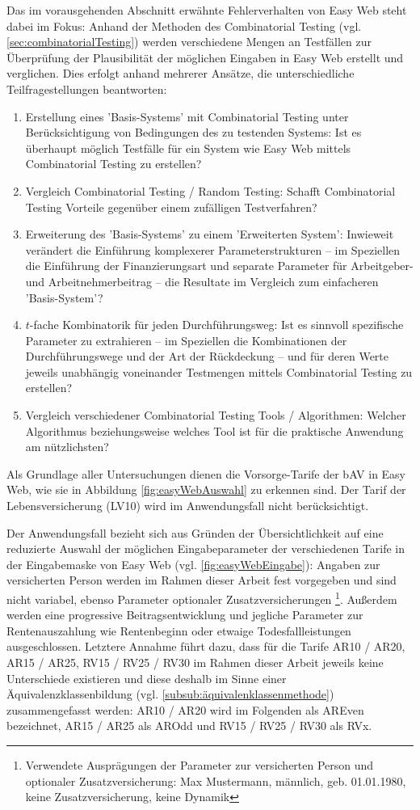 Das im vorausgehenden Abschnitt erwähnte Fehlerverhalten von Easy Web steht dabei im Fokus: Anhand der Methoden des Combinatorial Testing (vgl. \autoref{sec:combinatorialTesting}) werden verschiedene Mengen an Testfällen zur Überprüfung der Plausibilität der möglichen Eingaben in Easy Web erstellt und verglichen. Dies erfolgt anhand mehrerer Ansätze, die unterschiedliche Teilfragestellungen beantworten:
\begin{enumerate}
\item Erstellung eines 'Basis-Systems' mit Combinatorial Testing unter Berücksichtigung von Bedingungen des zu testenden Systems: Ist es überhaupt möglich Testfälle für ein System wie Easy Web mittels Combinatorial Testing zu erstellen?
\item Vergleich Combinatorial Testing / Random Testing: Schafft Combinatorial Testing Vorteile gegenüber einem zufälligen Testverfahren?
\item Erweiterung des 'Basis-Systems' zu einem 'Erweiterten System': Inwieweit verändert die Einführung komplexerer Parameterstrukturen -- im Speziellen die Einführung der Finanzierungsart und separate Parameter für Arbeitgeber- und Arbeitnehmerbeitrag -- die Resultate im Vergleich zum einfacheren 'Basis-System'?
\item $t$-fache Kombinatorik für jeden Durchführungsweg: Ist es sinnvoll spezifische Parameter zu extrahieren -- im Speziellen die Kombinationen der Durchführungswege und der Art der Rückdeckung -- und für deren Werte jeweils unabhängig voneinander Testmengen mittels Combinatorial Testing zu erstellen?
\item Vergleich verschiedener Combinatorial Testing Tools / Algorithmen: Welcher Algorithmus beziehungsweise welches Tool ist für die praktische Anwendung am nützlichsten?
\end{enumerate}

Als Grundlage aller Untersuchungen dienen die Vorsorge-Tarife der bAV in Easy Web, wie sie in Abbildung \ref{fig:easyWebAuswahl} zu erkennen sind. Der Tarif der Lebensversicherung (LV10) wird im Anwendungsfall nicht berücksichtigt. 

Der Anwendungsfall bezieht sich aus Gründen der Übersichtlichkeit auf eine reduzierte Auswahl der möglichen Eingabeparameter der verschiedenen Tarife in der Eingabemaske von Easy Web (vgl. \autoref{fig:easyWebEingabe}): Angaben zur versicherten Person werden im Rahmen dieser Arbeit fest vorgegeben und sind nicht variabel, ebenso Parameter optionaler Zusatzversicherungen \footnote{Verwendete Ausprägungen der Parameter zur versicherten Person und optionaler Zusatzversicherung: Max Mustermann, männlich, geb. 01.01.1980, keine Zusatzversicherung, keine Dynamik}. Außerdem werden eine progressive Beitragsentwicklung und jegliche Parameter zur Rentenauszahlung wie Rentenbeginn oder etwaige Todesfallleistungen ausgeschlossen. Letztere Annahme führt dazu, dass für die Tarife AR10 / AR20, AR15 / AR25, RV15 / RV25 / RV30 im Rahmen dieser Arbeit jeweils keine Unterschiede existieren und diese deshalb im Sinne einer Äquivalenzklassenbildung (vgl. \autoref{subsub:äquivalenklassenmethode}) zusammengefasst werden: AR10 / AR20 wird im Folgenden als AREven bezeichnet, AR15 / AR25 als AROdd und RV15 / RV25 / RV30 als RVx. 

